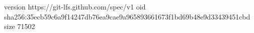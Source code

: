 version https://git-lfs.github.com/spec/v1
oid sha256:35ecb59c6a9f14247db76ea9cae9a965893661673f1bd69b48e9d33439451cbd
size 71502

